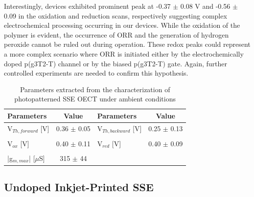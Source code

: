 Interestingly, devices exhibited prominent peak at -0.37 $\pm$ 0.08 V and -0.56 $\pm$ 0.09 in the oxidation and reduction scans, respectively suggesting complex electrochemical processing occurring in our devices. While the oxidation of the polymer is evident, the occurrence of ORR and the generation of hydrogen peroxide cannot be ruled out during operation. These redox peaks could represent a more complex scenario where ORR is initiated either by the electrochemically doped p(g3T2-T) channel or by the biased p(g3T2-T) gate. Again, further controlled experiments are needed to confirm this hypothesis.


\begin{table}[ht]
\centering
\caption{Parameters extracted from the characterization of photopatterned SSE OECT under ambient conditions}
\begin{tabular}{l|c||l|c}
Parameters & Value & Parameters & Value \\\hline \hline
V$_{Th,forward}$ [V] & 0.36 $\pm$ 0.05 & V$_{Th,backward}$ [V] & 0.25 $\pm$ 0.13 \\
& & &\\[-1em]
V$_{ox}$ [V] & 0.40 $\pm$ 0.11 & V$_{red}$ [V] & 0.40 $\pm$ 0.09 \\
& & &\\[-1em]
|g$_{m,max}$| [$\mu$S] & 315 $\pm$ 44 &  &\\\hline
\end{tabular}
\label{tab:photofom_amb}
\end{table}

\subsection{Undoped Inkjet-Printed SSE}%

